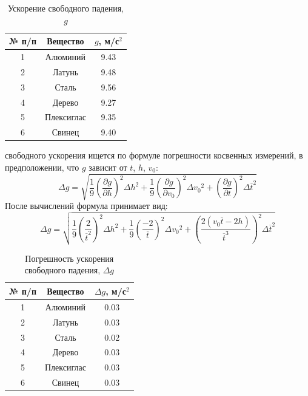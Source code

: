 \begin{center}
\begin{table}[H]
\centering
\caption{Ускорение свободного падения, $g$}
\label{table:4}
\begin{tabular}{|c|c|c|}
\hline
{} № п/п & Вещество & $g$, м/с$^2$ \\
\hline
1 & Алюминий     & 9.43 \\
2 & Латунь & 9.48\\
3 & Сталь   &9.56 \\
4 & Дерево       &9.27 \\
5 & Плексиглас     &9.35 \\
6 & Свинец     &9.40 \\
\hline
\end{tabular}
\end{table}
\end{center}
 свободного ускорения ищется по формуле погрешности косвенных измерений, в предположении, что $g$ зависит от $t$, $h$, $v_0$:
\begin{equation}
    \label{eq:10}
   \Delta g = \sqrt{
    \frac{1}{9} \left(\frac{\partial g}{\partial h}\right)^2 \Delta{h}^2 +
    \frac{1}{9} \left(\frac{\partial g}{\partial v_0}\right)^2 \Delta{v_0}^2 +
    \left(\frac{\partial g}{\partial t}\right)^2 \Delta{\overline{t}}^2}
\end{equation}
После вычислений формула принимает вид:
\begin{equation}
    \label{eq:11}
   \Delta g = \sqrt{
    \frac{1}{9} \left(\frac{2}{\overline{t}^2}\right)^2 \Delta{h}^2 +
    \frac{1}{9} \left(\frac{-2}{\overline{t}}\right)^2 \Delta{v_0}^2 +
    \left(\frac{2(v_0\overline{t}-2h)}{\overline{t}^3}\right)^2 \Delta{\overline{t}}^2}
\end{equation}
\begin{center}
\begin{table}[H]
\centering
\caption{Погрешность ускорения свободного падения, $\Delta g$}
\label{table:4}
\begin{tabular}{|c|c|c|}
\hline
{} № п/п & Вещество & $\Delta g$, м/с$^2$ \\
\hline
1 & Алюминий     & 0.03 \\
2 & Латунь & 0.03\\
3 & Сталь   &0.02 \\
4 & Дерево       &0.03 \\
5 & Плексиглас     &0.03 \\
6 & Свинец     &0.03 \\
\hline
\end{tabular}
\end{table}
\end{center}






